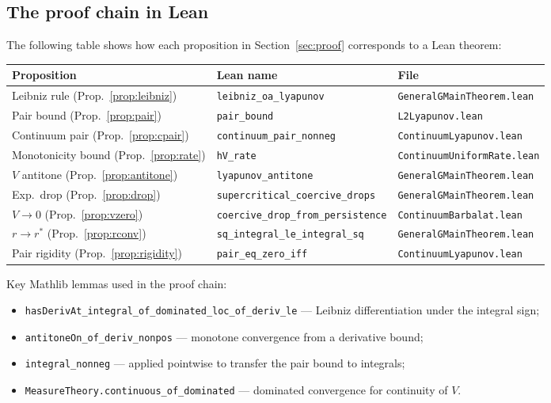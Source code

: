 \documentclass[11pt,a4paper]{article}
\theoremstyle{definition}
\begin{document}
\subsection{The proof chain in Lean}

The following table shows how each proposition in Section~\ref{sec:proof} corresponds to a Lean theorem:

\medskip
\begin{center}
\begin{tabular}{lll}
\textbf{Proposition} & \textbf{Lean name} & \textbf{File} \\
\hline
Leibniz rule (Prop.~\ref{prop:leibniz}) & \texttt{leibniz\_oa\_lyapunov} & \texttt{GeneralGMainTheorem.lean} \\
Pair bound (Prop.~\ref{prop:pair}) & \texttt{pair\_bound} & \texttt{L2Lyapunov.lean} \\
Continuum pair (Prop.~\ref{prop:cpair}) & \texttt{continuum\_pair\_nonneg} & \texttt{ContinuumLyapunov.lean} \\
Monotonicity bound (Prop.~\ref{prop:rate}) & \texttt{hV\_rate} & \texttt{ContinuumUniformRate.lean} \\
$V$ antitone (Prop.~\ref{prop:antitone}) & \texttt{lyapunov\_antitone} & \texttt{GeneralGMainTheorem.lean} \\
Exp.\ drop (Prop.~\ref{prop:drop}) & \texttt{supercritical\_coercive\_drops} & \texttt{GeneralGMainTheorem.lean} \\
$V \to 0$ (Prop.~\ref{prop:vzero}) & \texttt{coercive\_drop\_from\_persistence} & \texttt{ContinuumBarbalat.lean} \\
$r \to r^*$ (Prop.~\ref{prop:rconv}) & \texttt{sq\_integral\_le\_integral\_sq} & \texttt{GeneralGMainTheorem.lean} \\
Pair rigidity (Prop.~\ref{prop:rigidity}) & \texttt{pair\_eq\_zero\_iff} & \texttt{ContinuumLyapunov.lean}
\end{tabular}
\end{center}

\medskip\noindent Key Mathlib lemmas used in the proof chain:
\begin{itemize}
\item \texttt{hasDerivAt\_integral\_of\_dominated\_loc\_of\_deriv\_le} --- Leibniz differentiation under the integral sign;
\item \texttt{antitoneOn\_of\_deriv\_nonpos} --- monotone convergence from a derivative bound;
\item \texttt{integral\_nonneg} --- applied pointwise to transfer the pair bound to integrals;
\item \texttt{MeasureTheory.continuous\_of\_dominated} --- dominated convergence for continuity of $V$.
\end{itemize}
\end{document}
